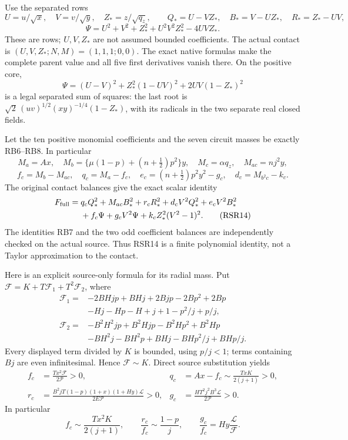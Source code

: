 Use the separated rows
\[
 U=u/\sqrt x,\quad V=v/\sqrt y,\quad Z_*=z/\sqrt{q_z},\qquad
 Q_*=U-VZ_*,\quad B_*=V-UZ_*,\quad R_*=Z_*-UV,
\]
\[
 \Psi=U^2+V^2+Z_*^2+U^2V^2Z_*^2-4UVZ_*.
 \tag{RSR12}
\]
These are rows; $U,V,Z_*$ are not assumed bounded coefficients.
The actual contact is $(U,V,Z_*;N,M)=(1,1,1;0,0)$.
The exact native formulas make the complete parent value and all five
first derivatives vanish there. On the positive core,
\[
 \Psi=(U-V)^2+Z_*^2(1-UV)^2+2UV(1-Z_*)^2
 \tag{RSR13}
\]
is a legal separated sum of squares: the last root is
$\sqrt2\,(uv)^{1/2}(xy)^{-1/4}(1-Z_*)$, with its radicals in
the two separate real closed fields.

Let the ten positive monomial coefficients and the seven circuit
masses be exactly RB6--RB8. In particular
\[
 M_a=Ax,\quad M_b=\{\mu(1-p)+(n+\tfrac12)p^2\}y,\quad
 M_c=\alpha q_z,\quad M_{ac}=nj^2y,
\]
\[
 f_c=M_b-M_{ac},\quad q_c=M_a-f_c,\quad
 e_c=(n+\tfrac12)p^2y^2-g_c,\quad d_c=M_{b^2c}-k_c.
\]
The original contact balances give the exact scalar identity
\begin{align*}
 F_{\rm full}={}&q_cQ_*^2+M_{ac}B_*^2+r_cR_*^2
  +d_cV^2Q_*^2+e_cV^2B_*^2\\
 &+f_c\Psi+g_cV^2\Psi+k_cZ_*^2(V^2-1)^2.
 \tag{RSR14}
\end{align*}
The identities RB7 and the two odd coefficient balances are independently
checked on the actual source. Thus RSR14 is a finite polynomial identity,
not a Taylor approximation to the contact.

Here is an explicit source-only formula for its radial mass. Put
$\mathcal F=K+T\mathcal F_1+T^2\mathcal F_2$, where
\begin{align*}
\mathcal F_1={}&-2BHjp+BHj+2Bjp-2Bp^2+2Bp\\
 &-Hj-Hp-H+j+1-p^2/j+p/j,\\
\mathcal F_2={}&-B^2H^2jp+B^2Hjp-B^2Hp^2+B^2Hp\\
 &-BH^2j-BH^2p+BHj-BHp^2/j+BHp/j.
 \tag{RSR15}
\end{align*}
Every displayed term divided by $K$ is bounded, using $p/j<1$;
terms containing $Bj$ are even infinitesimal. Hence $\mathcal F\sim K$.
Direct source substitution yields
\[
\begin{aligned}
 f_c&=\frac{Tx^2\mathcal F}{2\mathcal P}>0,&
 q_c&=Ax-f_c\sim\frac{TxK}{2(j+1)}>0,\\
 r_c&=\frac{B^2jT(1-p)(1+x)(1+Hy)\mathcal L}
                {2E\mathcal P}>0,&
 g_c&=\frac{HT^2j^2B^3\mathcal L}{2\mathcal P}>0.
\end{aligned}
 \tag{RSR16}
\]
In particular
\[
 f_c\sim\frac{Tx^2K}{2(j+1)},\qquad
 \frac{r_c}{f_c}\sim\frac{1-p}{j},\qquad
 \frac{g_c}{f_c}=Hy\frac{\mathcal L}{\mathcal F}.
 \tag{RSR17}
\]

